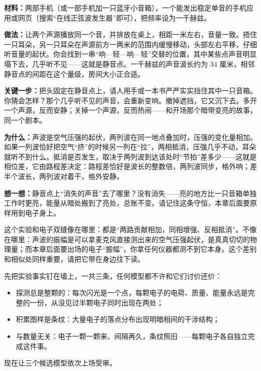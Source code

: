 \begin{experiment}[两只音箱的静音点]
\textbf{材料：}两部手机（或一部手机加一只蓝牙小音箱），一个能发出稳定单音的手机应用或网页（搜索“在线正弦波发生器”即可），把频率设为一千赫兹。

\textbf{做法：}让两个声源播放同一个音，并排放在桌上，相距一米左右，音量一致。捂住一只耳朵，另一只耳朵在声源前方一两米的范围内缓慢移动，头部左右平移，仔细听音量的起伏。你会找到一串“响—轻—响—轻”交替的位置，其中某些点声音明显塌下去，几乎听不见——这就是静音点。一千赫兹的声音波长约为 \(34\) 厘米，相邻静音点的间距在这个量级，房间大小正合适。

\textbf{关键一步：}把头固定在静音点上，请人用手或一本书严严实实挡住其中一只音箱。你猜会怎样？那个几乎听不见的声音，会重新变响。撤掉遮挡，它又沉下去。多开一个声源，反而安静；关掉一个声源，反而热闹——和开场那个暗带变亮的故事，同一个剧本。

\textbf{为什么：}声波是空气压强的起伏，两列波在同一地点叠加时，压强的变化量相加。如果一列波恰好把空气“挤”的时候另一列在“拉”，两相抵消，压强几乎不动，耳朵就听不到什么。抵消是否发生，取决于两列波到达该处时“节拍”差多少——这就是相位差，它由路程差决定：路程差恰好是波长的整数倍，两列波同步，格外响；差半个波长，两列波对着干，格外安静。

\textbf{想一想：}静音点上“消失的声音”去了哪里？没有消失——亮的地方比一只音箱单独工作时更亮，能量从暗处搬到了亮处，总账不变。请记住这条守恒，本章后面要原样用到电子身上。
\end{experiment}

这个实验和电子双缝像在哪里：都是“两路贡献相加，同相增强、反相抵消”。不像在哪里：声波的振幅是可以拿麦克风直接测出来的空气压强起伏，是真真切切的物理量；而本章后面要出场的电子“振幅”，你拿任何仪器都测不到它本身。这个差别和相似处同样重要，请把它带在身边往下读。


先把实验事实钉在墙上，一共三条，任何模型都不许和它们讨价还价：

\begin{itemize}[leftmargin=1.8em]
\item 探测总是整颗的：每次闪光是一个点，每颗电子的电荷、质量、能量永远是完整的一份，从没见过半颗电子同时出现在两处；
\item 积累图样是条纹：大量电子的落点分布出现明暗相间的干涉结构；
\item 与数量无关：电子一颗一颗来、间隔再久，条纹照旧——每颗电子各自独立完成这件事。
\end{itemize}

现在让三个候选模型依次上场受审。

